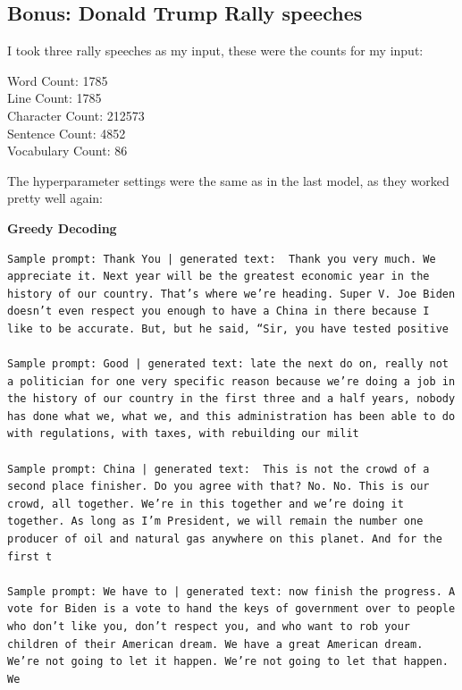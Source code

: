 \documentclass{article}
\begin{document}
\subsection{Bonus: Donald Trump Rally speeches}
I took three rally speeches as my input, these were the counts for my input:
\begin{center}
    Word Count:  1785\\
    Line Count:  1785\\
    Character Count:  212573\\
    Sentence Count:  4852\\
    Vocabulary Count:  86\\
\end{center}
The hyperparameter settings were the same as in the last model, as they worked pretty well again:
\begin{table}[ht]
\centering
{}
\caption{Model hyperparameters}
\label{tab:hyper}
\end{table}
\textbf{Greedy Decoding}
\begin{lstlisting}
Sample prompt: Thank You | generated text:  Thank you very much. We appreciate it. Next year will be the greatest economic year in the history of our country. That’s where we’re heading. Super V. Joe Biden doesn’t even respect you enough to have a China in there because I like to be accurate. But, but he said, “Sir, you have tested positive 

Sample prompt: Good | generated text: late the next do on, really not a politician for one very specific reason because we’re doing a job in the history of our country in the first three and a half years, nobody has done what we, what we, and this administration has been able to do with regulations, with taxes, with rebuilding our milit

Sample prompt: China | generated text:  This is not the crowd of a second place finisher. Do you agree with that? No. No. This is our crowd, all together. We’re in this together and we’re doing it together. As long as I’m President, we will remain the number one producer of oil and natural gas anywhere on this planet. And for the first t

Sample prompt: We have to | generated text: now finish the progress. A vote for Biden is a vote to hand the keys of government over to people who don’t like you, don’t respect you, and who want to rob your children of their American dream. We have a great American dream. We’re not going to let it happen. We’re not going to let that happen. We
\end{lstlisting}
\end{document}
